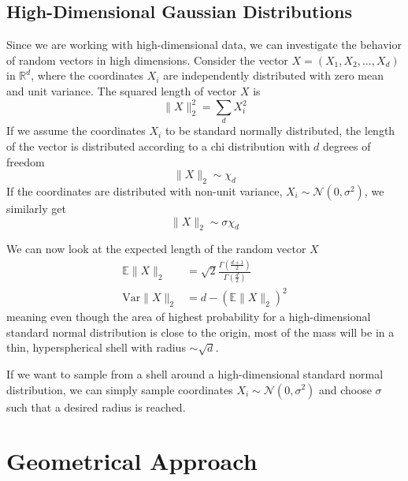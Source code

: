 \subsection{High-Dimensional Gaussian Distributions}%
\label{sub:high_dimensional_gaussian_distributions}
Since we are working with high-dimensional data, we can investigate the
behavior of random vectors in high dimensions.
Consider the vector $X = (X_1, X_2, \dots, X_d)$ in $\mathbb{R}^d$, where the
coordinates $X_i$ are independently distributed with zero mean and unit
variance. The squared length of vector $X$ is
\begin{equation}%
    \label{eq:square_norm}
    \lVert X \rVert_2^2 = \sum_d X_i^2
\end{equation}
If we assume the coordinates $X_i$ to be standard normally distributed, the
length of the vector is distributed according to a chi distribution with
$d$ degrees of freedom
\begin{equation}%
    \label{eq:sq_norm_chi}
    \lVert X \rVert_2 \sim \chi_d
\end{equation}
If the coordinates are distributed with non-unit variance, $X_i \sim
\mathcal{N}(0, \sigma^2)$, we similarly get
\begin{equation}%
    \label{eq:sq_norm_chi_sigma}
    \lVert X \rVert_2 \sim \sigma\chi_d
\end{equation}

We can now look at the expected length of the random vector $X$
\begin{equation}
    \begin{aligned}%
        \label{eq:mean_var_sq_dist}
        \mathbb{E} \lVert X \rVert_2 &= \sqrt{2} \frac{\Gamma(\frac{d +
        1}{2})}{\Gamma(\frac{d}{2})} \\
        \mathrm{Var} \lVert X \rVert_2 &= d - (\mathbb{E} \lVert X \rVert_2)^2
    \end{aligned}
\end{equation}
meaning even though the area of highest probability for a high-dimensional
standard normal distribution is close to the origin, most of the mass will be
in a thin, hyperspherical shell with radius $\sim \sqrt{d}$.

If we want to sample from a shell around a high-dimensional standard normal
distribution, we can simply sample coordinates $X_i \sim \mathcal{N}(0,
\sigma^2)$ and choose $\sigma$ such that a desired radius is reached.



\section{Geometrical Approach}%
\label{sec:geometrical_approach}

